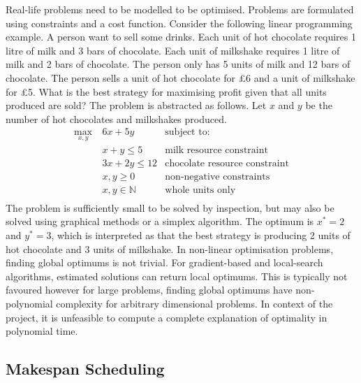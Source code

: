Real-life problems need to be modelled to be optimised. Problems are formulated using constraints and a cost function. Consider the following linear programming example. A person want to sell some drinks. Each unit of hot chocolate requires 1 litre of milk and 3 bars of chocolate. Each unit of milkshake requires 1 litre of milk and 2 bars of chocolate. The person only has 5 units of milk and 12 bars of chocolate. The person sells a unit of hot chocolate for £6 and a unit of milkshake for £5. What is the best strategy for maximising profit given that all units produced are sold? The problem is abstracted as follows. Let $x$ and $y$ be the number of hot chocolates and milkshakes produced.
\begin{align*}
	\max_{x,y}\ &6x+5y&\text{subject to:}\\
	&x+y\leq 5&\text{milk resource constraint}\\
	&3x+2y\leq 12&\text{chocolate resource constraint}\\
	&x,y\geq 0&\text{non-negative constraints}\\
	&x,y\in\mathbb{N}&\text{whole units only}\\
\end{align*}
The problem is sufficiently small to be solved by inspection, but may also be solved using graphical methods or a simplex algorithm. The optimum is $x^*=2$ and $y^*=3$, which is interpreted as that the best strategy is producing 2 units of hot chocolate and 3 units of milkshake.
\linespace
In non-linear optimisation problems, finding global optimums is not trivial. For gradient-based and local-search algorithms, estimated solutions can return local optimums. This is typically not favoured however for large problems, finding global optimums have non-polynomial complexity for arbitrary dimensional problems. In context of the project, it is unfeasible to compute a complete explanation of optimality in polynomial time.

\subsection{Makespan Scheduling}

